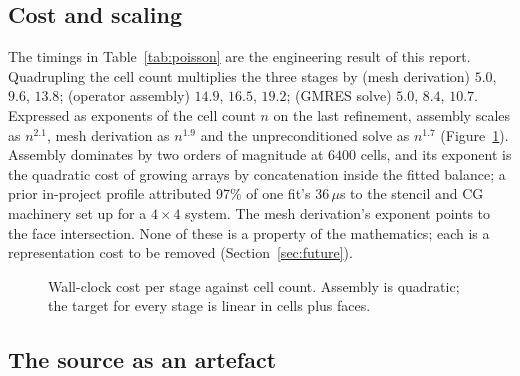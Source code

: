 \documentclass[11pt,a4paper]{article}
\begin{document}
\subsection{Cost and scaling}\label{sec:cost}

The timings in Table~\ref{tab:poisson} are the engineering result of this report. Quadrupling the cell count multiplies the three stages by (mesh derivation) $5.0$, $9.6$, $13.8$; (operator assembly) $14.9$, $16.5$, $19.2$; (GMRES solve) $5.0$, $8.4$, $10.7$. Expressed as exponents of the cell count $n$ on the last refinement, assembly scales as $n^{2.1}$, mesh derivation as $n^{1.9}$ and the unpreconditioned solve as $n^{1.7}$ (Figure~\ref{fig:cost}). Assembly dominates by two orders of magnitude at $6400$ cells, and its exponent is the quadratic cost of growing arrays by concatenation inside the fitted balance; a prior in-project profile attributed 97\% of one fit's 36\,$\mu$s to the stencil and CG machinery set up for a $4\times4$ system. The mesh derivation's exponent points to the face intersection. None of these is a property of the mathematics; each is a representation cost to be removed (Section~\ref{sec:future}).

\begin{figure}[H]
\centering
{}
\caption{Wall-clock cost per stage against cell count. Assembly is quadratic; the target for every stage is linear in cells plus faces.}
\label{fig:cost}
\end{figure}

\subsection{The source as an artefact}
\end{document}
